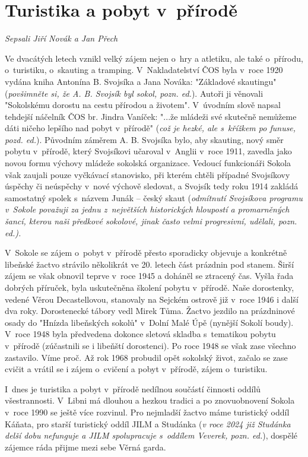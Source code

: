 \documentclass[a5paper, 12pt, twoside]{article}
\begin{document}
\section{Turistika a pobyt
v~přírodě}

\textit{Sepsali Jiří Novák a Jan Přech}

Ve dvacátých letech vznikl velký zájem nejen o~hry a atletiku, ale také
o~přírodu, o~turistiku, o~skauting a tramping. V~Nakladatelství ČOS byla
v~roce 1920 vydána kniha Antonína B. Svojsíka a Jana Nováka: "Základové
skautingu" (\textit{povšimněte si, že A. B. Svojsík byl sokol, pozn.
ed.}). Autoři ji věnovali "Sokolskému dorostu na cestu přírodou a
životem". V~úvodním slově napsal tehdejší náčelník ČOS br. Jindra
Vaníček: "...že mládeži své skutečně nemůžeme dáti ničeho lepšího nad
pobyt v~přírodě" (\textit{což je hezké, ale s~křížkem po funuse, pozd.
ed.}). Původním záměrem A. B. Svojsíka bylo, aby skauting, nový směr
pobytu v~přírodě, který Svojsíkovi učaroval v~Anglii v~roce 1911,
zavedla jako novou formu výchovy mládeže sokolská organizace. Vedoucí
funkcionáři Sokola však zaujali pouze vyčkávací stanovisko, při kterém
chtěli případné Svojsíkovy úspěchy či neúspěchy v~nové výchově sledovat,
a Svojsík tedy roku 1914 zakládá samostatný spolek s~názvem Junák --
český skaut (\textit{odmítnutí Svojsíkova programu v~Sokole považuji za
jednu z~největších historických hloupostí a promarněných šancí, kterou
naši předkové sokolové, jinak často velmi progresivní, udělali, pozn.
ed.).}

V~Sokole se zájem o~pobyt v~přírodě přesto sporadicky objevuje a
konkrétně libeňské žactvo strávilo několikrát ve 20. letech část
prázdnin pod stanem. Širší zájem se však obnovil teprve v~roce 1945 a
doháněl se ztracený čas. Vyšla řada dobrých příruček, byla uskutečněna
školení pobytu v~přírodě. Naše dorostenky, vedené Věrou Decastellovou,
stanovaly na Sejckém ostrově již v~roce 1946 i další dva roky.
Dorostenecké tábory vedl Mirek Tůma. Žactvo jezdilo na prázdninové osady
do "Hnízda libeňských sokolů" v~Dolní Malé Úpě (nynější Sokolí boudy).
V~roce 1948 byla předvedena dokonce sletová skladba s~tematikou pobytu
v~přírodě (zúčastnili se i libeňští dorostenci). Po roce 1948 se však zase
všechno zastavilo. Víme proč. Až rok 1968 probudil opět sokolský život,
začalo se zase cvičit a vrátil se i zájem o~cvičení a pobyt v~přírodě,
zájem o~turistiku.

I~dnes je turistika a pobyt v~přírodě nedílnou součástí činnosti oddílů
všestrannosti. V~Libni má dlouhou a hezkou tradici a po znovuobnovení
Sokola v~roce 1990 se ještě více rozvinul. Pro nejmladší žactvo máme
turistický oddíl Káňata, pro starší turistický oddíl JILM a Studánka
(\textit{v roce 2024 již Studánka delší dobu nefunguje a JILM spolupracuje
s~oddílem Veverek, pozn. ed.}), dospělé zájemce ráda přijme mezi sebe
Věrná garda.
\end{document}
